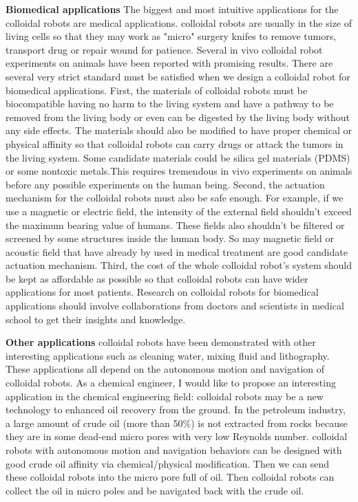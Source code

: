 \textbf{Biomedical applications} The biggest and most intuitive applications for the colloidal robots are medical applications. colloidal robots are usually in the size of living cells so that they may work as "micro" surgery knifes to remove tumors, transport drug or repair wound for patience. Several in vivo colloidal robot experiments  on animals have been reported \autocite{Gao2015,li2018development} with promising results. There are several very strict standard must be satisfied when we design a colloidal robot for biomedical applications. First, the materials of colloidal robots must be biocompatible  having no harm to the living system and have a pathway to be removed from the living body or even can be digested by the living body without any side effects.
The materials should also be modified to have proper chemical or physical affinity so that colloidal robots can carry drugs or attack the tumors in the living system. Some candidate materials could be silica gel materials (PDMS) or some nontoxic metals.This requires tremendous in vivo experiments on animals before  any possible experiments on the human being. Second, the actuation mechanism for the colloidal robots must also be safe enough. For example, if we use a magnetic or electric field, the intensity of the external field shouldn't exceed the maximum bearing value of humans. These fields also shouldn't be  filtered or screened by some structures inside the human body. So may magnetic field or acoustic field that have already by used in medical treatment are good  candidate actuation mechanism.  Third, the cost of the whole colloidal robot's system should be kept as affordable as possible so that colloidal robots can have wider applications for most patients. Research on colloidal robots for biomedical applications should involve collaborations from doctors and scientists in medical school to get their insights and knowledge.

\textbf{Other applications} colloidal robots have been demonstrated with other interesting applications such as cleaning water, mixing fluid and lithography\autocite{soler2014catalytic,fei2019magneto,li2014nanomotor}. These applications all depend on the autonomous motion and navigation of colloidal robots. As a chemical engineer, I would like to propose an interesting application in the chemical engineering field: colloidal robots may be a new technology to enhanced oil recovery from the ground. In the petroleum industry, a large amount of crude oil (more than 50$\%$) is not extracted from rocks because they are in some dead-end micro pores with very low Reynolds number. colloidal robots with autonomous motion and navigation behaviors can be designed with good crude oil affinity via chemical/physical modification. Then we can send these colloidal robots into the micro pore full of oil.  Then colloidal robots  can collect the oil in micro poles and be navigated back with the crude oil.

